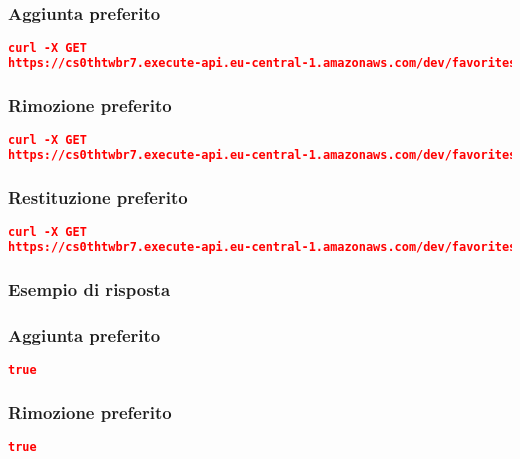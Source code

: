 \subsubsection{Aggiunta preferito}
\begin{lstlisting}[language=json]
curl -X GET 
https://cs0thtwbr7.execute-api.eu-central-1.amazonaws.com/dev/favorites?action=add&user=515d659b-baec-413b-9b37-703498372093&restaurant=100
\end{lstlisting}

\subsubsection{Rimozione preferito}
\begin{lstlisting}[language=json]
curl -X GET 
https://cs0thtwbr7.execute-api.eu-central-1.amazonaws.com/dev/favorites?action=remove&user=515d659b-baec-413b-9b37-703498372093&restaurant=100
\end{lstlisting}



\subsubsection{Restituzione preferito}
\begin{lstlisting}[language=json]
curl -X GET 
https://cs0thtwbr7.execute-api.eu-central-1.amazonaws.com/dev/favorites?action=get&user=515d659b-baec-413b-9b37-703498372093
\end{lstlisting}

\pagebreak

\subsubsection{Esempio di risposta}
\subsubsection{Aggiunta preferito}
\begin{lstlisting}[language=json]
true
\end{lstlisting}

\subsubsection{Rimozione preferito}
\begin{lstlisting}[language=json]
true
\end{lstlisting}



